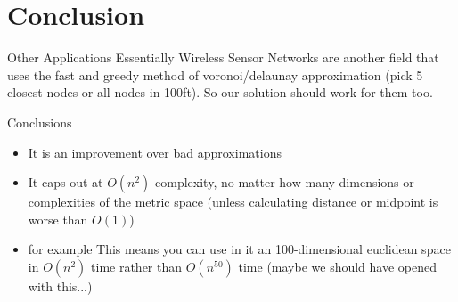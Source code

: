 \documentclass[8pt]{beamer}
\begin{document}
\section{Conclusion}
	\begin{frame}{Other Applications}
		Essentially Wireless Sensor Networks are another field that uses the fast and greedy method of voronoi/delaunay approximation (pick 5 closest nodes or all nodes in 100ft). So our solution should work for them too.
	\end{frame}	
	
	\begin{frame}{Conclusions}
		\begin{itemize}
			\item It is an improvement over bad approximations
			\item It caps out at $O(n^2)$ complexity, no matter how many dimensions or complexities of the metric space (unless calculating distance or midpoint is worse than $O(1)$)
			\item for example This means you can use in it an 100-dimensional euclidean space in $O(n^2)$ time rather than $O(n^{50})$ time (maybe we should have opened with this...)
		\end{itemize}
	\end{frame}		



	
\end{document}
